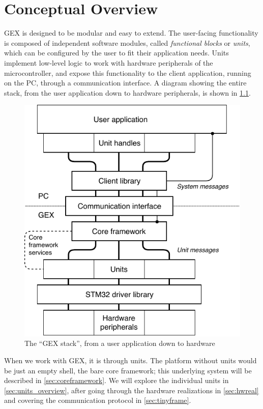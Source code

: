 \chapter{Conceptual Overview} \label{sec:conceptual}

GEX is designed to be modular and easy to extend. The user-facing functionality is composed of independent software modules, called \textit{functional blocks} or \textit{units}, which can be configured by the user to fit their application needs. Units implement low-level logic to work with hardware peripherals of the microcontroller, and expose this functionality to the client application, running on the \gls{PC}, through a communication interface. A diagram showing the entire stack, from the user application down to hardware peripherals, is shown in \cref{fig:conceptual}.

\begin{figure}[h]
	\centering
	\includegraphics[scale=1]{img/conceptual.pdf}
	\caption[GEX conceptual overview]{\label{fig:conceptual}The ``GEX stack'', from a user application down to hardware}
\end{figure}

When we work with GEX, it is through units. The platform without units would be just an empty shell, the bare core framework; this underlying system will be described in \cref{sec:coreframework}. We will explore the individual units in \cref{sec:units_overview}, after going through the hardware realizations in \cref{sec:hwreal} and covering the communication protocol in \cref{sec:tinyframe}. 

